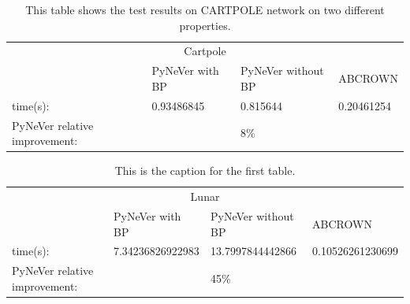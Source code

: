 \begin{table}[]
    \centering
    \begin{tabular}{@{}llll@{}}
        \toprule
        \multicolumn{4}{c}{Cartpole}  \\
        \cmidrule(r){1-4}
                                            & PyNeVer with BP                        & PyNeVer without BP               & ABCROWN                           \\ \cmidrule(r){1-4}
    time(s):                                & {\color[HTML]{ACB9CA} 0.93486845}      & {\color[HTML]{ACB9CA} 0.815644} & {\color[HTML]{ACB9CA} 0.20461254}  \\ \cmidrule(r){1-4}
    PyNeVer relative improvement:           &                                        & {\color[HTML]{FF0000} 8\%}       &                                   \\ \cmidrule(r){1-4}
    \end{tabular}
    \caption{This table shows the test results on CARTPOLE network on two different properties.}
    \label{table:CARTPOLE}
\end{table}


\begin{table}[]
    \centering
    \begin{tabular}{@{}llll@{}}
        \toprule
        \multicolumn{4}{c}{Lunar}  \\
        \cmidrule(r){1-4}
                                             & PyNeVer with BP & PyNeVer without BP                & ABCROWN                           \\ \cmidrule(r){1-4}
    time(s):                                 & {\color[HTML]{ACB9CA} 7.34236826922983}                   & {\color[HTML]{ACB9CA} 13.7997844442866}  & {\color[HTML]{ACB9CA} 0.10526261230699} \\ \cmidrule(r){1-4}
    PyNeVer relative improvement:            &                                                     & {\color[HTML]{FF0000} 45\%}       &                                   \\ \cmidrule(r){1-4}
    \end{tabular}
    \caption{This is the caption for the first table.}
    \label{table:LUNAR}
\end{table}


